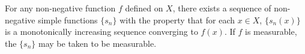 For any non-negative function $f$ defined on $X$, there exists a sequence of non-negative simple functions $\{s_n\}$ with the property that for each $x \in X$, $\{s_n(x)\}$ is a monotonically increasing sequence converging to $f(x)$. If $f$ is measurable, the $\{s_n\}$ may be taken to be measurable.
